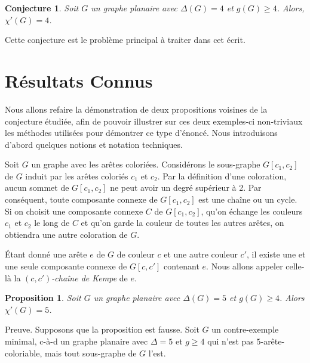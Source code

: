 \documentclass[10pt,a4paper]{article}
\newtheorem{proposition}{Proposition}
\newtheorem{conjecture}{Conjecture}
\begin{document}
\begin{conjecture}
Soit $G$ un graphe planaire avec $\Delta(G) = 4$ et $g(G) \geq 4$. Alors, $\chi'(G) = 4$. 
\end{conjecture} 

Cette conjecture est le problème principal à traiter dans cet écrit. 

\section{Résultats Connus}
\label{chap:easy}

Nous allons refaire la démonstration de deux propositions voisines de la conjecture étudiée, afin de pouvoir illustrer sur ces deux exemples-ci non-triviaux les méthodes utilisées pour démontrer ce type d'énoncé. Nous introduisons d'abord quelques notions et notation techniques.

Soit $G$ un graphe avec les arêtes coloriées. 
Considérons le sous-graphe $G[c_1,c_2]$ de $G$ induit par les arêtes coloriés $c_1$ et $c_2$. Par la définition d'une coloration, aucun sommet de $G[c_1,c_2]$ ne peut avoir un degré supérieur à 2. Par conséquent, toute composante connexe de $G[c_1,c_2]$ est une chaîne ou un cycle. Si on choisit une composante connexe $C$ de $G[c_1,c_2]$, qu'on échange les couleurs $c_1$ et $c_2$ le long de $C$ et qu'on garde la couleur de toutes les autres arêtes, on obtiendra une autre coloration de $G$.

Étant donné une arête $e$ de $G$ de couleur $c$ et une autre couleur $c'$, il existe une et une seule composante connexe de $G[c,c']$ contenant $e$.
Nous allons appeler celle-là la \emph{$(c,c')$-chaîne de Kempe} de $e$.



\begin{proposition}
Soit $G$ un graphe planaire avec $\Delta(G) = 5$ et $g(G) \geq 4$. Alors $\chi'(G)=5$.
\label{prop:545}
\end{proposition}

Preuve. Supposons que la proposition est fausse. Soit $G$ un contre-exemple minimal, c-à-d un graphe planaire avec $\Delta = 5$ et $g \geq 4$ qui n'est pas $5$-arête-coloriable, mais tout sous-graphe de $G$ l'est.
\end{document}

